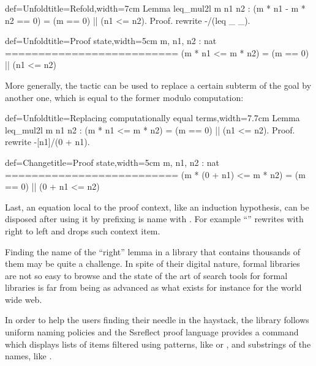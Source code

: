 \begin{coq}{def=Unfold}{title=Refold,width=7cm}
Lemma leq_mul2l m n1 n2 :
  (m * n1 - m * n2 == 0) =
    (m == 0) || (n1 <= n2).
Proof.
rewrite -/(leq _ _).
\end{coq}
\begin{coqout}{def=Unfold}{title=Proof state,width=5cm}
m, n1, n2 : nat
==========================
(m * n1 <= m * n2) =
  (m == 0) || (n1 <= n2)
\end{coqout}

More generally, the  tactic can be used to replace a
certain subterm of the goal by another one, which is equal to the
former modulo computation:

\begin{coq}{def=Unfold}{title=Replacing computationally equal terms,width=7.7cm}
Lemma leq_mul2l m n1 n2 :
(m * n1 <= m * n2) = (m == 0) || (n1 <= n2).
Proof.
rewrite -[n1]/(0 + n1).
\end{coq}
\begin{coqout}{def=Change}{title=Proof state,width=5cm}
m, n1, n2 : nat
==========================
(m * (0 + n1) <= m * n2) =
(m == 0) || (0 + n1 <= n2)
\end{coqout}

Last, an equation local to the proof context, like an
induction hypothesis, can be disposed after using it by
prefixing is name with \C{\{\}}.  For example
``'' rewrites with  right to
left and drops such context item.


\label{sec:search}

Finding the name of the ``right'' lemma in a library that contains
thousands of them may be quite a challenge. In spite of their digital
nature, formal libraries are not so easy to browse and the state
of the art of search tools for formal libraries is far from being as
advanced as what exists for instance for the world wide web.

In order to help the users finding their needle in the haystack,
the \mcbMC{} library follows uniform naming policies and the Ssreflect
proof language provides a  command which displays lists of
items filtered using patterns, like \C{(_ * _ + _)}
or , and substrings of the names, like .


